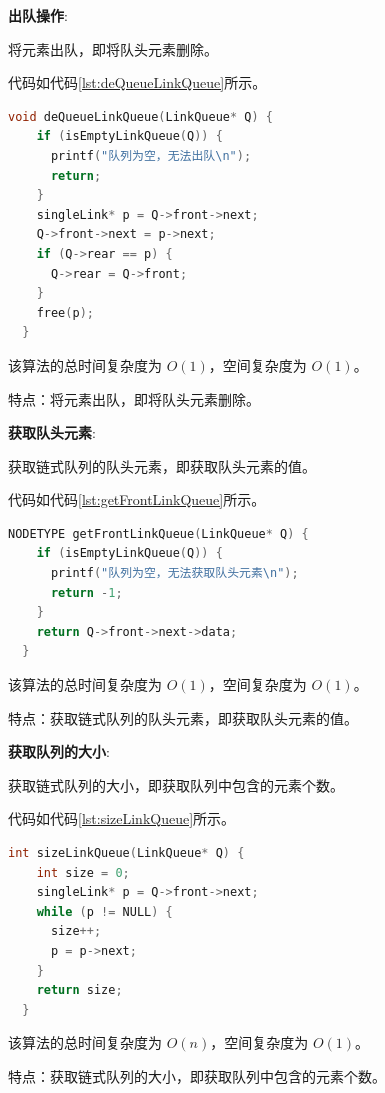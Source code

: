 \documentclass[lang=cn,newtx,10pt,scheme=chinese]{../elegantbook}
\begin{document}
\textbf{出队操作}:

将元素出队，即将队头元素删除。

代码如代码\ref{lst:deQueueLinkQueue}所示。

\begin{lstlisting}[language=C++, caption={出队示例代码}, label={lst:deQueueLinkQueue}]
  void deQueueLinkQueue(LinkQueue* Q) {
    if (isEmptyLinkQueue(Q)) {
      printf("队列为空，无法出队\n");
      return;
    }
    singleLink* p = Q->front->next;
    Q->front->next = p->next;
    if (Q->rear == p) {
      Q->rear = Q->front;
    }
    free(p);
  }

\end{lstlisting}

该算法的总时间复杂度为 $O(1)$，空间复杂度为 $O(1)$。

特点：将元素出队，即将队头元素删除。

\textbf{获取队头元素}:

获取链式队列的队头元素，即获取队头元素的值。

代码如代码\ref{lst:getFrontLinkQueue}所示。

\begin{lstlisting}[language=C++, caption={获取队头元素示例代码}, label={lst:getFrontLinkQueue}]
  NODETYPE getFrontLinkQueue(LinkQueue* Q) {
    if (isEmptyLinkQueue(Q)) {
      printf("队列为空，无法获取队头元素\n");
      return -1;
    }
    return Q->front->next->data;
  }

\end{lstlisting}

该算法的总时间复杂度为 $O(1)$，空间复杂度为 $O(1)$。

特点：获取链式队列的队头元素，即获取队头元素的值。

\textbf{获取队列的大小}:

获取链式队列的大小，即获取队列中包含的元素个数。

代码如代码\ref{lst:sizeLinkQueue}所示。

\begin{lstlisting}[language=C++, caption={获取队列的大小示例代码}, label={lst:sizeLinkQueue}]
  int sizeLinkQueue(LinkQueue* Q) {
    int size = 0;
    singleLink* p = Q->front->next;
    while (p != NULL) {
      size++;
      p = p->next;
    }
    return size;
  }

\end{lstlisting}

该算法的总时间复杂度为 $O(n)$，空间复杂度为 $O(1)$。

特点：获取链式队列的大小，即获取队列中包含的元素个数。
\end{document}

